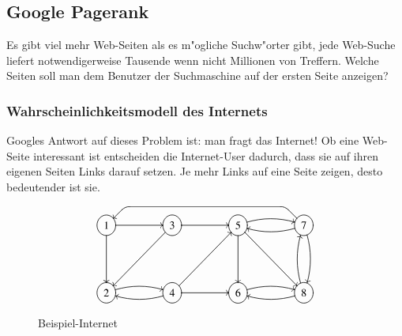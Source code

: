 %
%
%
\subsection{Google Pagerank}
Es gibt viel mehr Web-Seiten als es m"ogliche Suchw"orter gibt, jede Web-Suche
liefert notwendigerweise Tausende wenn nicht Millionen von Treffern.
Welche Seiten soll man dem Benutzer der Suchmaschine auf der ersten Seite 
anzeigen?

\subsubsection{Wahrscheinlichkeitsmodell des Internets}
Googles Antwort auf dieses Problem ist: man fragt das Internet!
Ob eine Web-Seite interessant ist entscheiden die Internet-User dadurch,
dass sie auf ihren eigenen Seiten Links darauf setzen. Je mehr Links auf
eine Seite zeigen, desto bedeutender ist sie.
\begin{figure}
\[\UseTips
\entrymodifiers={++[o][F]}
\xymatrix @=1.5cm {
1 \ar[r] \ar[d]
	& 3 \ar[r] \ar[dl]
		& 5 \ar[d] \ar@/^/[r] \ar[rd]
			& 7 \ar@/^/[d]  \ar@/^/[l]
                                \ar `ul^l[lll]+/u6mm/`l^dl[lll] [lll]
\\
2 \ar@/^/[r]
	& 4 \ar@/^/[l] \ar[r] \ar[ur]
		& 6 \ar@/^/[r]
			& 8 \ar@/^/[l] \ar@/^/[u]
}
\]
\caption{Beispiel-Internet\label{google-sample}}
\end{figure}%

